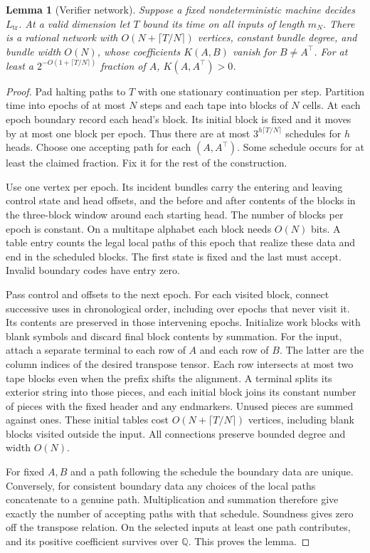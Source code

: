 \documentclass[11pt]{article}
\newtheorem{lemma}[theorem]{Lemma}
\newcommand{\TrLang}{L_{\mathrm{tr}}}
\begin{document}
\begin{lemma}[Verifier network]\label{lem:network}
Suppose a fixed nondeterministic machine decides $\TrLang$. At a valid
dimension let $T$ bound its time on all inputs of length $m_N$.
There is a rational network with $O(N+\lceil T/N\rceil)$ vertices,
constant bundle degree, and bundle width $O(N)$, whose coefficients
$K(A,B)$ vanish for $B\ne A^\top$. For at least a
$2^{-O(1+\lceil T/N\rceil)}$ fraction of $A$, $K(A,A^\top)>0$.
\end{lemma}
\begin{proof}
Pad halting paths to $T$ with one stationary continuation per step.
Partition time into epochs of at most $N$ steps and each tape into
blocks of $N$ cells. At each epoch boundary record each head's block.
Its initial block is fixed and it moves by at most one block per epoch.
Thus there are at most $3^{h\lceil T/N\rceil}$ schedules for $h$
heads. Choose one accepting path for each $(A,A^\top)$. Some schedule
occurs for at least the claimed fraction. Fix it for the rest of
the construction.

Use one vertex per epoch. Its incident bundles carry the entering and
leaving control state and head offsets, and the before and after
contents of the blocks in the three-block window around each starting
head. The number of blocks per epoch is constant. On a multitape
alphabet each block needs $O(N)$ bits. A table entry counts the legal
local paths of this epoch that realize these data and end in the
scheduled blocks. The first state is fixed and the last must accept.
Invalid boundary codes have entry zero.

Pass control and offsets to the next epoch. For each visited block,
connect successive uses in chronological order, including over epochs
that never visit it. Its contents are preserved in those intervening
epochs. Initialize work blocks with blank symbols and discard final
block contents by summation. For the input, attach a separate terminal
to each row of $A$ and each row of $B$. The latter are the column
indices of the desired transpose tensor. Each row intersects at most
two tape blocks even when the prefix shifts the alignment. A terminal
splits its exterior string into those pieces, and each initial block
joins its constant number of pieces with the fixed header and any
endmarkers. Unused pieces are summed against ones. These initial
tables cost $O(N+\lceil T/N\rceil)$ vertices, including blank blocks
visited outside the input. All connections preserve bounded degree
and width $O(N)$.

For fixed $A,B$ and a path following the schedule the boundary data
are unique. Conversely, for consistent boundary data any choices of
the local paths concatenate to a genuine path. Multiplication and
summation therefore give exactly the number of accepting paths with
that schedule. Soundness gives zero off the transpose relation. On
the selected inputs at least one path contributes, and its positive
coefficient survives over $\mathbb Q$. This proves the lemma.
\end{proof}
\end{document}

